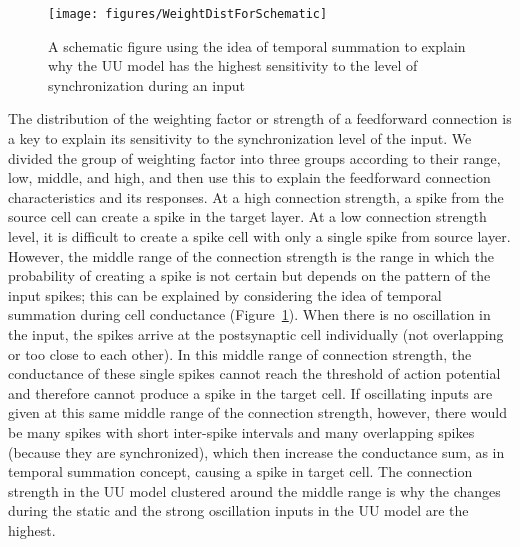 \begin{figure}[!h]
	\centering
	\texttt{[image: figures/WeightDistForSchematic]}
	\caption{A schematic figure using the idea of temporal summation \cite{magee1999dendritic}  to explain why the UU model has the highest sensitivity to the level of synchronization during an input} 
	\label{fig:WdistSchematic}
\end{figure}



 The distribution of the weighting factor or strength of a feedforward connection is a key to explain its sensitivity to the synchronization level of the input.  We divided the group of weighting factor into three groups according to their range, low, middle, and high, and then use this to explain the feedforward connection characteristics and its responses. At a high connection strength, a spike from the source cell can create a spike in the target layer. At a low connection strength level, it is difficult to create a spike cell with only a single spike from source layer. However, the middle range of the connection strength is the range in which the probability of creating a spike is not certain but depends on the pattern of the input spikes; this can be explained by considering the idea of temporal summation during cell conductance (Figure~\ref{fig:WdistSchematic}). When there is no oscillation in the input, the spikes arrive at the postsynaptic cell individually (not overlapping or too close to each other).  In this middle range of connection strength, the conductance of these single spikes cannot reach the threshold of action potential and therefore cannot produce a spike in the target cell.  If oscillating inputs are given at this same middle range of the connection strength, however, there would be many spikes with short inter-spike intervals and many overlapping spikes (because they are synchronized), which then increase the conductance sum, as in temporal summation concept, causing a spike in target cell. The connection strength in the UU model clustered around the middle range is why the changes during the static and the strong oscillation inputs in the UU model are the highest. 




